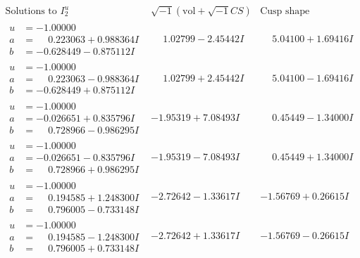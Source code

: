 \documentclass[1p]{elsarticle_modified}
\theoremstyle{definition}
\newcommand{\I}{\sqrt{-1}}
\begin{document}
$$\begin{array}{c|c|c}  
\text{Solutions to }I^u_{2}& \I (\text{vol} + \sqrt{-1}CS) & \text{Cusp shape}\\
 \hline 
\begin{aligned}
u &= -1.00000\phantom{ +0.000000I} \\
a &= \phantom{-}0.223063 + 0.988364 I \\
b &= -0.628449 - 0.875112 I\end{aligned}
 & \phantom{-}1.02799 - 2.45442 I & \phantom{-}5.04100 + 1.69416 I \\ \hline\begin{aligned}
u &= -1.00000\phantom{ +0.000000I} \\
a &= \phantom{-}0.223063 - 0.988364 I \\
b &= -0.628449 + 0.875112 I\end{aligned}
 & \phantom{-}1.02799 + 2.45442 I & \phantom{-}5.04100 - 1.69416 I \\ \hline\begin{aligned}
u &= -1.00000\phantom{ +0.000000I} \\
a &= -0.026651 + 0.835796 I \\
b &= \phantom{-}0.728966 - 0.986295 I\end{aligned}
 & -1.95319 + 7.08493 I & \phantom{-}0.45449 - 1.34000 I \\ \hline\begin{aligned}
u &= -1.00000\phantom{ +0.000000I} \\
a &= -0.026651 - 0.835796 I \\
b &= \phantom{-}0.728966 + 0.986295 I\end{aligned}
 & -1.95319 - 7.08493 I & \phantom{-}0.45449 + 1.34000 I \\ \hline\begin{aligned}
u &= -1.00000\phantom{ +0.000000I} \\
a &= \phantom{-}0.194585 + 1.248300 I \\
b &= \phantom{-}0.796005 - 0.733148 I\end{aligned}
 & -2.72642 - 1.33617 I & -1.56769 + 0.26615 I \\ \hline\begin{aligned}
u &= -1.00000\phantom{ +0.000000I} \\
a &= \phantom{-}0.194585 - 1.248300 I \\
b &= \phantom{-}0.796005 + 0.733148 I\end{aligned}
 & -2.72642 + 1.33617 I & -1.56769 - 0.26615 I \\ \hline\begin{aligned}

\end{aligned}
\end{array}$$
\end{document}
